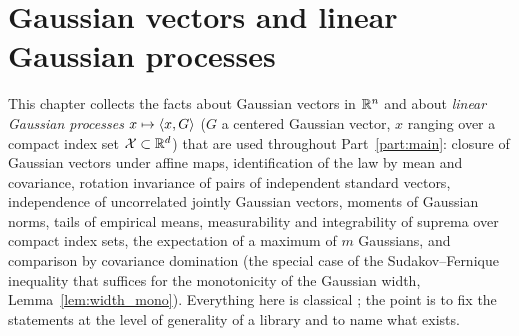 \chapter{Gaussian vectors and linear Gaussian processes}
\label{chap:pre_gaussian}

This chapter collects the facts about Gaussian vectors in $\mathbb{R}^n$ and about \emph{linear
Gaussian processes} $x \mapsto \langle x, G \rangle$ ($G$ a centered Gaussian vector, $x$ ranging over
a compact index set $\mathcal{X} \subset \mathbb{R}^d$) that are used throughout Part~\ref{part:main}: closure
of Gaussian vectors under affine maps, identification of the law by mean and covariance,
rotation invariance of pairs of independent standard vectors, independence of uncorrelated
jointly Gaussian vectors, moments of Gaussian norms, tails of empirical means, measurability
and integrability of suprema over compact index sets, the expectation of a maximum of $m$
Gaussians, and comparison by covariance domination (the special case of the
Sudakov--Fernique inequality that suffices for the monotonicity of the Gaussian width,
Lemma~\ref{lem:width_mono}). Everything here is classical
\cite{vershynin2018high, boucheron2013concentration}; the point is to fix the statements at
the level of generality of a library and to name what exists.

